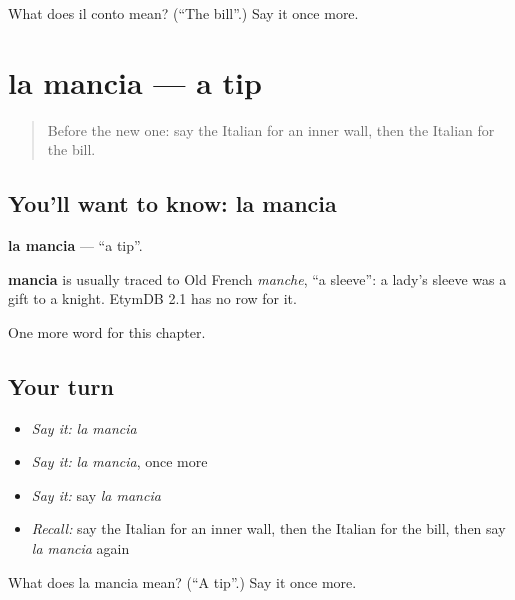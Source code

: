 \begin{tcolorbox}[breakable,colback=teal!4,colframe=teal!35!black,title={Before you move on}]
What does il conto mean? (\textquotedblleft{}The bill\textquotedblright{}.) Say it once more.
\end{tcolorbox}
\section[la mancia]{la mancia — a tip}

\label{lesson:IT-C160-mancia}



\begin{quote}
Before the new one: say the Italian for an inner wall, then the Italian for the bill.
\end{quote}

\subsection*{You'll want to know: la mancia}
\textbf{la mancia} — \textquotedblleft{}a tip\textquotedblright{}.

\begin{cousinweb}
\textbf{mancia} is usually traced to Old French \emph{manche}, \textquotedblleft{}a sleeve\textquotedblright{}: a lady's sleeve was a gift to a knight. EtymDB 2.1 has no row for it.
\end{cousinweb}

\begin{grammarlens}[title={What you've built}]
One more word for this chapter.
\end{grammarlens}

\subsection*{Your turn}
\begin{itemize}
\raggedright
  \item \emph{Say it:} \emph{la mancia}
  \item \emph{Say it:} \emph{la mancia}, once more
  \item \emph{Say it:} say \emph{la mancia}
  \item \emph{Recall:} say the Italian for an inner wall, then the Italian for the bill, then say \emph{la mancia} again
\end{itemize}

\begin{tcolorbox}[breakable,colback=teal!4,colframe=teal!35!black,title={Before you move on}]
What does la mancia mean? (\textquotedblleft{}A tip\textquotedblright{}.) Say it once more.
\end{tcolorbox}
